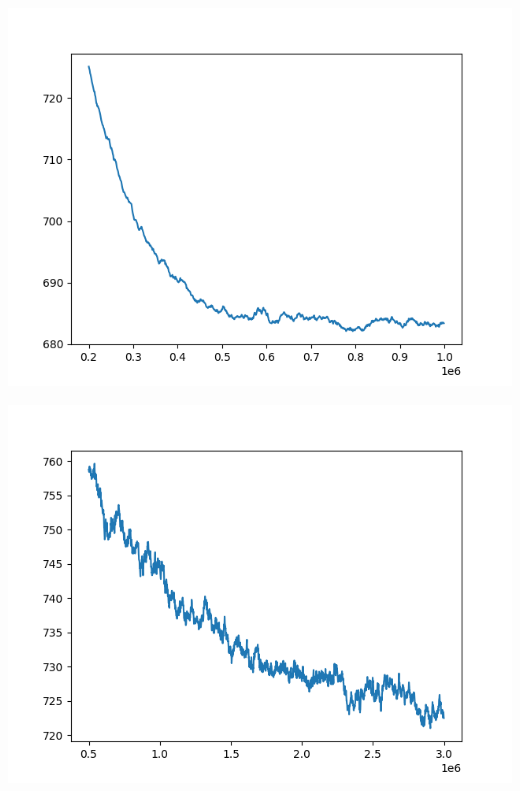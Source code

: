 \documentclass{article}
\begin{document}
\begin{enumerate}[label=\arabic*.]
\begin{minipage}{0.49\linewidth}
            \includegraphics[width=\linewidth]{../starter_code/figs/sgd_wo_k_60.png}
        \end{minipage}\hfill
        \begin{minipage}{0.49\linewidth}
            \includegraphics[width=\linewidth]{../starter_code/figs/sgd_k60.png}
        \end{minipage}\hfill
        \begin{minipage}{0.49\linewidth}

\end{minipage}
\end{enumerate}
\end{document}
